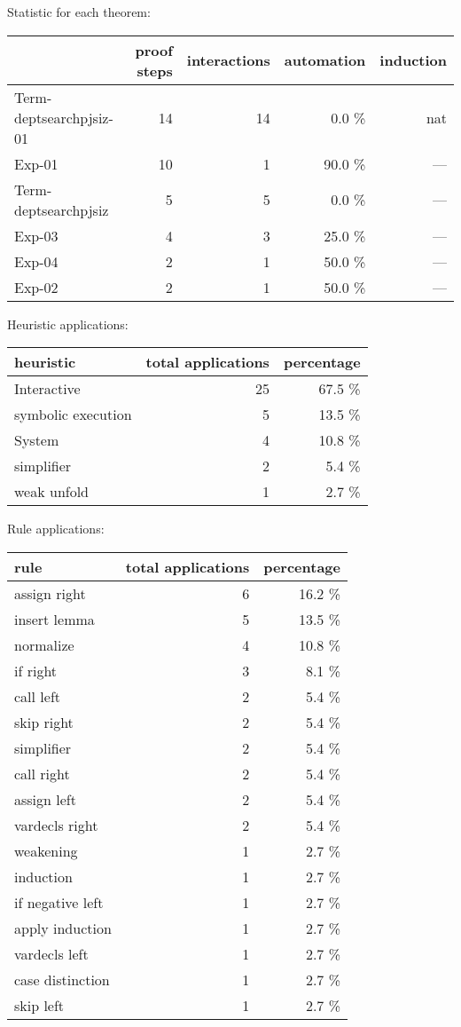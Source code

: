 {Statistic for each theorem:

\begin{supertabular}{l|r|r|r|r}
	& proof steps & interactions & automation & induction\\ \hline
Term-deptsearchpjsiz-01 & 14 & 14 & 0.0 \% & nat\\
Exp-01 & 10 & 1 & 90.0 \% & ---\\
Term-deptsearchpjsiz & 5 & 5 & 0.0 \% & ---\\
Exp-03 & 4 & 3 & 25.0 \% & ---\\
Exp-04 & 2 & 1 & 50.0 \% & ---\\
Exp-02 & 2 & 1 & 50.0 \% & ---\\

\end{supertabular}

Heuristic applications:

\begin{supertabular}{l|r|r}
heuristic	& total applications & percentage \\ \hline
Interactive & 25 & 67.5 \% \\
symbolic execution & 5 & 13.5 \% \\
System & 4 & 10.8 \% \\
simplifier & 2 & 5.4 \% \\
weak unfold & 1 & 2.7 \% \\

\end{supertabular}

Rule applications:

\begin{supertabular}{l|r|r}
rule	        & total applications & percentage \\ \hline
assign right & 6 & 16.2 \% \\
insert lemma & 5 & 13.5 \% \\
normalize & 4 & 10.8 \% \\
if right & 3 & 8.1 \% \\
call left & 2 & 5.4 \% \\
skip right & 2 & 5.4 \% \\
simplifier & 2 & 5.4 \% \\
call right & 2 & 5.4 \% \\
assign left & 2 & 5.4 \% \\
vardecls right & 2 & 5.4 \% \\
weakening & 1 & 2.7 \% \\
induction & 1 & 2.7 \% \\
if negative left & 1 & 2.7 \% \\
apply induction & 1 & 2.7 \% \\
vardecls left & 1 & 2.7 \% \\
case distinction & 1 & 2.7 \% \\
skip left & 1 & 2.7 \% \\


\end{supertabular}}
